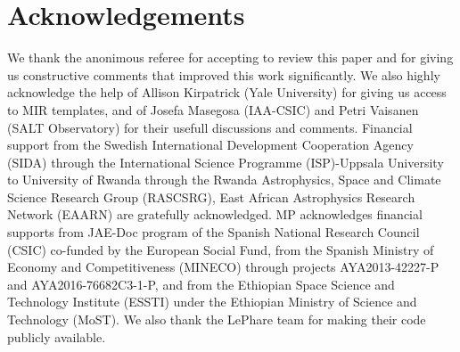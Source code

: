 \documentclass[fleqn,usenatbib]{mnras}
\begin{document}
\section*{Acknowledgements}
We thank the anonimous referee for accepting to review this paper and for giving us constructive comments that improved this work
significantly. We also highly acknowledge the help of Allison Kirpatrick (Yale University) for giving us access to
MIR templates, and of Josefa Masegosa (IAA-CSIC) and Petri Vaisanen (SALT Observatory) for their usefull discussions and comments. Financial support from the Swedish International Development Cooperation Agency (SIDA) through the International Science Programme (ISP)-Uppsala University to University of Rwanda through the Rwanda Astrophysics, Space and Climate Science Research Group (RASCSRG), East African Astrophysics Research Network (EAARN) are gratefully acknowledged. MP acknowledges financial supports from JAE-Doc program of the Spanish National Research Council (CSIC) co-funded by
the European Social Fund, from the Spanish Ministry of Economy and Competitiveness (MINECO) through projects AYA2013-42227-P and AYA2016-76682C3-1-P, and from the Ethiopian Space Science and Technology Institute (ESSTI) under the Ethiopian Ministry of Science and Technology (MoST). We also thank the LePhare team for making their code publicly available.

















\bsp	%
\label{lastpage}
\end{document}
